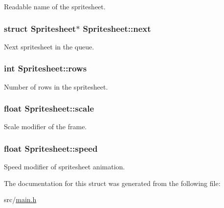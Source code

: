 \-Readable name of the spritesheet. \hypertarget{structSpritesheet_a671f77f759138aa2c852e5252b6daac5}{
\subsubsection[{next}]{\setlength{\rightskip}{0pt plus 5cm}struct {\bf \-Spritesheet}$\ast$ {\bf \-Spritesheet\-::next}}}\label{structSpritesheet_a671f77f759138aa2c852e5252b6daac5}
\-Next spritesheet in the queue. \hypertarget{structSpritesheet_aeab321ce6cdd45cc8a5078e80480510e}{
\subsubsection[{rows}]{\setlength{\rightskip}{0pt plus 5cm}int {\bf \-Spritesheet\-::rows}}}\label{structSpritesheet_aeab321ce6cdd45cc8a5078e80480510e}
\-Number of rows in the spritesheet. \hypertarget{structSpritesheet_ac46cf3d01609f66aae140e3b7d3d1109}{
\subsubsection[{scale}]{\setlength{\rightskip}{0pt plus 5cm}float {\bf \-Spritesheet\-::scale}}}\label{structSpritesheet_ac46cf3d01609f66aae140e3b7d3d1109}
\-Scale modifier of the frame. \hypertarget{structSpritesheet_ad011770ca540de2bad85f0cb155c774b}{
\subsubsection[{speed}]{\setlength{\rightskip}{0pt plus 5cm}float {\bf \-Spritesheet\-::speed}}}\label{structSpritesheet_ad011770ca540de2bad85f0cb155c774b}
\-Speed modifier of spritesheet animation. 

\-The documentation for this struct was generated from the following file\-:\begin{DoxyCompactItemize}
\item 
src/\hyperlink{main_8h}{main.\-h}\end{DoxyCompactItemize}
